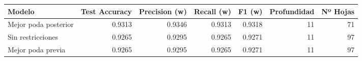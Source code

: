 \begin{tabular}{lrrrrrr}
\toprule
Modelo & Test Accuracy & Precision (w) & Recall (w) & F1 (w) & Profundidad & Nº Hojas \\
\midrule
Mejor poda posterior & 0.9313 & 0.9346 & 0.9313 & 0.9318 & 11 & 71 \\
Sin restricciones & 0.9265 & 0.9295 & 0.9265 & 0.9271 & 11 & 97 \\
Mejor poda previa & 0.9265 & 0.9295 & 0.9265 & 0.9271 & 11 & 97 \\
\bottomrule
\end{tabular}
